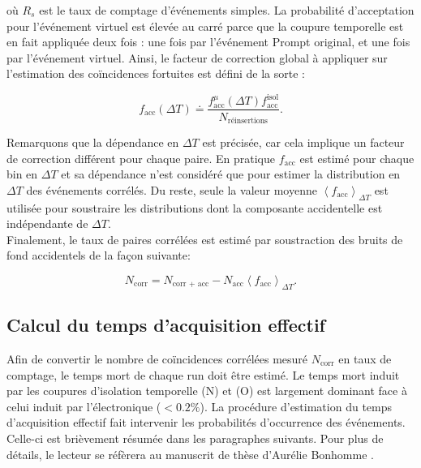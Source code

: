 \bigbreak

où $R_s$ est le taux de comptage d'événements simples. La probabilité d'acceptation pour l'événement virtuel est élevée au carré parce que la coupure temporelle est en fait appliquée deux fois : une fois par l'événement Prompt original, et une fois par l'événement virtuel. Ainsi, le facteur de correction global à appliquer sur l'estimation des coïncidences fortuites est défini de la sorte :

\begin{equation}
    f_\textrm{acc}(\Delta T) \doteq \frac{f^\mu_\textrm{acc} (\Delta T) f^\textrm{isol}_\textrm{acc}}{N_\textrm{réinsertions}}.
\end{equation}

\bigbreak

Remarquons que la dépendance en $\Delta T$ est précisée, car cela implique un facteur de correction différent pour chaque paire. En pratique $f_\textrm{acc}$ est estimé pour chaque bin en $\Delta T$ et sa dépendance n'est considéré que pour estimer la distribution en $\Delta T$ des événements corrélés. Du reste, seule la valeur moyenne $\left< f_\textrm{acc} \right>_{\Delta T} $ est utilisée pour soustraire les distributions dont la composante accidentelle est indépendante de $\Delta T$.\\

Finalement, le taux de paires corrélées est estimé par soustraction des bruits de fond accidentels de la façon suivante:

\begin{equation}
    N_\textrm{corr} = N_\textrm{corr + acc} - N_\textrm{acc} \left< f_\textrm{acc} \right>_{\Delta T}.
\end{equation}

\bigbreak

\subsection{Calcul du temps d'acquisition effectif}

Afin de convertir le nombre de coïncidences corrélées mesuré $N_\textrm{corr}$ en taux de comptage, le temps mort de chaque run doit être estimé. Le temps mort induit par les coupures d'isolation temporelle (N) et (O) est largement dominant face à celui induit par l'électronique ($< 0.2 \%$). La procédure  d'estimation du temps d'acquisition effectif fait intervenir les probabilités d'occurrence des événements. Celle-ci est brièvement résumée dans les paragraphes suivants. Pour plus de détails, le lecteur se réfèrera au manuscrit de thèse d'Aurélie Bonhomme \cite{bonhomme:tel-01931309}.\\

